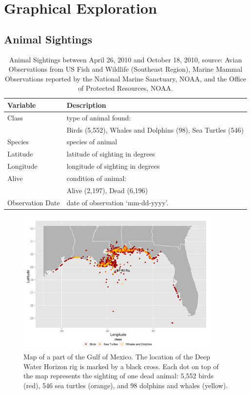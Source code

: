 \documentclass[authoryear,12pt]{elsarticle}
\begin{document}

%
\section{Graphical Exploration}
\subsection{Animal Sightings}
\begin{table}
\begin{tabular}[hbt]{lp{11cm}}\hline
\bf Variable & \bf Description \\\hline
Class & type of animal found: \\
& {\small Birds (5,552),   Whales and Dolphins  (98),  Sea Turtles (546)}\\
Species & species of animal \\
Latitude & latitude {of sighting} in degrees  \\
Longitude & longitude {of sighting} in degrees\\
Alive & condition of animal: \\
& {\small Alive (2,197), Dead (6,196)} \\
Observation Date & date of observation `mm-dd-yyyy'. \\\hline
\end{tabular}
\caption{Animal Sightings between April 26, 2010 and October 18, 2010, source: Avian Observations from US Fish and Wildlife (Southeast Region),  Marine Mammal Observations reported by  the National Marine Sanctuary, NOAA, and the Office of Protected Resources, NOAA.}
\label{table-animal}
\end{table}
\begin{figure}[htbp] %
   \centering
   \includegraphics[width=4in]{animal_deaths.png} 
   \caption{Map of a part of the Gulf of Mexico. The location of the Deep Water Horizon rig is marked by a black cross. Each dot on top of the map represents the sighting of one dead animal: 5,552  birds (red), 546 sea turtles (orange), and 98 dolphins and whales (yellow). }
   \label{deaths}
\end{figure}
\end{document}
